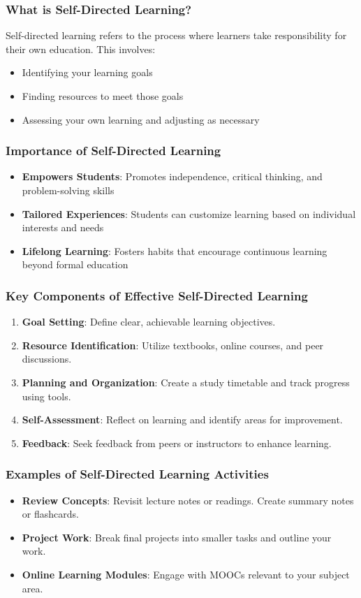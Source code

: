 \documentclass[aspectratio=169]{beamer}
\begin{document}
\begin{frame}[fragile]
    \frametitle{What is Self-Directed Learning?}
    Self-directed learning refers to the process where learners take responsibility for their own education. This involves:
    \begin{itemize}
        \item Identifying your learning goals
        \item Finding resources to meet those goals
        \item Assessing your own learning and adjusting as necessary
    \end{itemize}
\end{frame}

\begin{frame}[fragile]
    \frametitle{Importance of Self-Directed Learning}
    \begin{itemize}
        \item \textbf{Empowers Students}: Promotes independence, critical thinking, and problem-solving skills
        \item \textbf{Tailored Experiences}: Students can customize learning based on individual interests and needs
        \item \textbf{Lifelong Learning}: Fosters habits that encourage continuous learning beyond formal education
    \end{itemize}
\end{frame}

\begin{frame}[fragile]
    \frametitle{Key Components of Effective Self-Directed Learning}
    \begin{enumerate}
        \item \textbf{Goal Setting}: Define clear, achievable learning objectives.
        \item \textbf{Resource Identification}: Utilize textbooks, online courses, and peer discussions.
        \item \textbf{Planning and Organization}: Create a study timetable and track progress using tools.
        \item \textbf{Self-Assessment}: Reflect on learning and identify areas for improvement.
        \item \textbf{Feedback}: Seek feedback from peers or instructors to enhance learning.
    \end{enumerate}
\end{frame}

\begin{frame}[fragile]
    \frametitle{Examples of Self-Directed Learning Activities}
    \begin{itemize}
        \item \textbf{Review Concepts}: Revisit lecture notes or readings. Create summary notes or flashcards.
        \item \textbf{Project Work}: Break final projects into smaller tasks and outline your work.
        \item \textbf{Online Learning Modules}: Engage with MOOCs relevant to your subject area.
    \end{itemize}
\end{frame}
\end{document}
